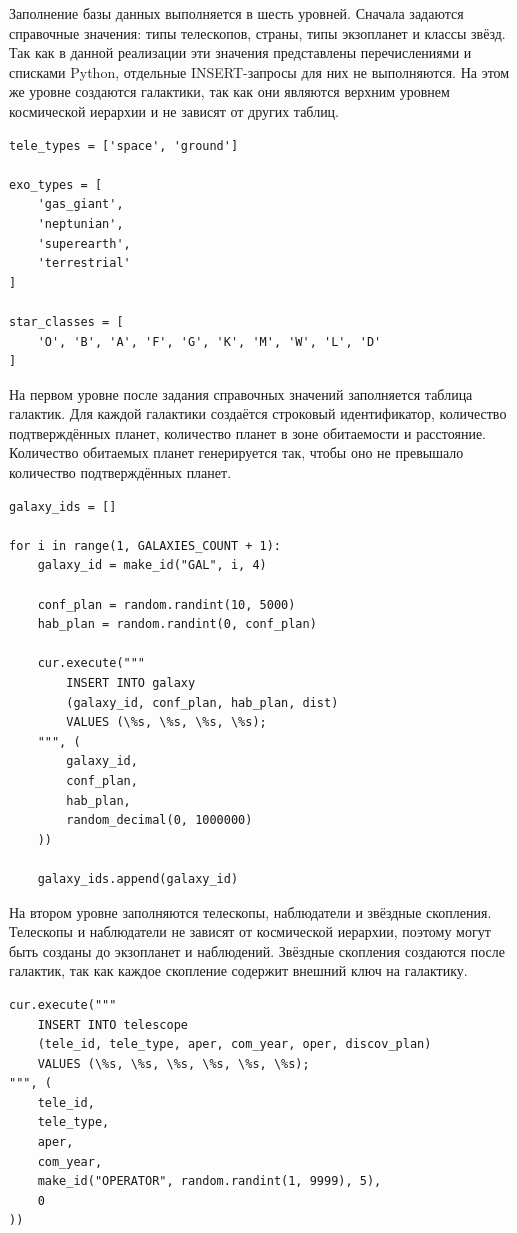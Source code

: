 \documentclass[14pt,a4paper]{extarticle}
\begin{document}
Заполнение базы данных выполняется в шесть уровней. Сначала задаются справочные значения: типы телескопов, страны, типы экзопланет и классы звёзд. Так как в данной реализации эти значения представлены перечислениями и списками Python, отдельные INSERT-запросы для них не выполняются. На этом же уровне создаются галактики, так как они являются верхним уровнем космической иерархии и не зависят от других таблиц.

\begin{lstlisting}[caption={Справочные значения}]
tele_types = ['space', 'ground']

exo_types = [
    'gas_giant',
    'neptunian',
    'superearth',
    'terrestrial'
]

star_classes = [
    'O', 'B', 'A', 'F', 'G', 'K', 'M', 'W', 'L', 'D'
]
\end{lstlisting}

На первом уровне после задания справочных значений заполняется таблица галактик. Для каждой галактики создаётся строковый идентификатор, количество подтверждённых планет, количество планет в зоне обитаемости и расстояние. Количество обитаемых планет генерируется так, чтобы оно не превышало количество подтверждённых планет.

\begin{lstlisting}[caption={Вставка галактик}]
galaxy_ids = []

for i in range(1, GALAXIES_COUNT + 1):
    galaxy_id = make_id("GAL", i, 4)

    conf_plan = random.randint(10, 5000)
    hab_plan = random.randint(0, conf_plan)

    cur.execute("""
        INSERT INTO galaxy
        (galaxy_id, conf_plan, hab_plan, dist)
        VALUES (\%s, \%s, \%s, \%s);
    """, (
        galaxy_id,
        conf_plan,
        hab_plan,
        random_decimal(0, 1000000)
    ))

    galaxy_ids.append(galaxy_id)
\end{lstlisting}

На втором уровне заполняются телескопы, наблюдатели и звёздные скопления. Телескопы и наблюдатели не зависят от космической иерархии, поэтому могут быть созданы до экзопланет и наблюдений. Звёздные скопления создаются после галактик, так как каждое скопление содержит внешний ключ на галактику.

\begin{lstlisting}[caption={Вставка телескопа}]
cur.execute("""
    INSERT INTO telescope
    (tele_id, tele_type, aper, com_year, oper, discov_plan)
    VALUES (\%s, \%s, \%s, \%s, \%s, \%s);
""", (
    tele_id,
    tele_type,
    aper,
    com_year,
    make_id("OPERATOR", random.randint(1, 9999), 5),
    0
))
\end{lstlisting}
\end{document}
